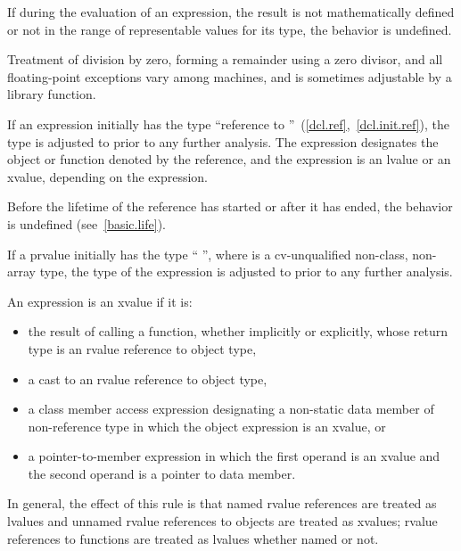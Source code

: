\pnum
{}%
%
%
%
%
If during the evaluation of an expression, the result is not
mathematically defined or not in the range of representable values for
its type, the behavior is undefined.
\begin{note}
%
Treatment of division by zero, forming a remainder using a zero divisor,
and all floating-point exceptions vary among machines, and is sometimes
adjustable by a library function.
\end{note}

\pnum
{}%
If an expression initially has the type ``reference to
''~(\ref{dcl.ref},~\ref{dcl.init.ref}), the type is adjusted to
 prior to any further analysis. The expression designates the
object or function denoted by the reference, and the expression
is an lvalue or an xvalue, depending on the expression.
\begin{note}
Before the lifetime of the reference has started or after it has ended,
the behavior is undefined (see~\ref{basic.life}).
\end{note}

\pnum
If a prvalue initially has the type ``\cv{} '', where
 is a cv-unqualified non-class, non-array type, the type of
the expression is adjusted to  prior to any further analysis.

\pnum
{}%
\begin{note}
An expression is an xvalue if it is:
\begin{itemize}
\item the result of calling a function, whether implicitly or explicitly,
whose return type is an rvalue reference to object type,

\item a cast to an rvalue reference to object type,

\item a class member access expression designating a non-static data member
of non-reference type
in which the object expression is an xvalue, or

\item a  pointer-to-member expression in which the first operand is
an xvalue and the second operand is a pointer to data member.
\end{itemize}
In general, the effect of this rule is that named rvalue references are
treated as lvalues and unnamed rvalue references to objects are treated as
xvalues; rvalue references to functions are treated as lvalues whether named or not.
\end{note}

